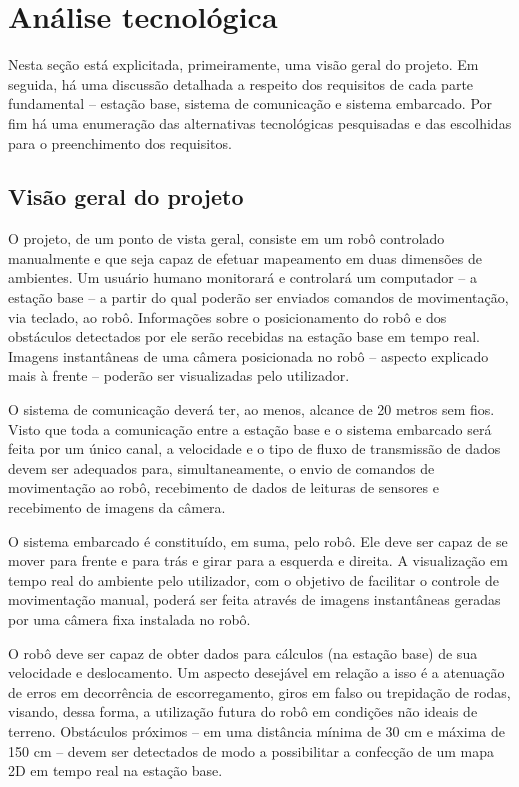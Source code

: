 \chapter{Análise tecnológica}
Nesta seção está explicitada, primeiramente, uma visão geral do projeto. Em seguida, há uma discussão detalhada a respeito dos requisitos de cada parte fundamental -- estação base, sistema de comunicação e sistema embarcado. Por fim há uma enumeração das alternativas tecnológicas pesquisadas e das escolhidas para o preenchimento dos requisitos.

\section{Visão geral do projeto}

O projeto, de um ponto de vista geral, consiste em um robô controlado manualmente e que seja capaz de efetuar mapeamento em duas dimensões de ambientes. Um usuário humano monitorará e controlará um computador -- a estação base -- a partir do qual poderão ser enviados comandos de movimentação, via teclado, ao robô. Informações sobre o posicionamento do robô e dos obstáculos detectados por ele serão recebidas na estação base em tempo real. Imagens instantâneas de uma câmera posicionada no robô -- aspecto explicado mais à frente -- poderão ser visualizadas pelo utilizador.

O sistema de comunicação deverá ter, ao menos, alcance de 20 metros sem fios. Visto que toda a comunicação entre a estação base e o sistema embarcado será feita por um único canal, a velocidade e o tipo de fluxo de transmissão de dados devem ser adequados para, simultaneamente, o envio de comandos de movimentação ao robô, recebimento de dados de leituras de sensores e recebimento de imagens da câmera.

O sistema embarcado é constituído, em suma, pelo robô. Ele deve ser capaz de se mover para frente e para trás e girar para a esquerda e direita. A visualização em tempo real do ambiente pelo utilizador, com o objetivo de facilitar o controle de movimentação manual, poderá ser feita através de imagens instantâneas geradas por uma câmera fixa instalada no robô. 

O robô deve ser capaz de obter dados para cálculos (na estação base) de sua velocidade e deslocamento. Um aspecto desejável em relação a isso é a atenuação de erros em decorrência de escorregamento, giros em falso ou trepidação de rodas, visando, dessa forma, a utilização futura do robô em condições não ideais de terreno. Obstáculos próximos -- em uma distância mínima de 30 cm e máxima de 150 cm -- devem ser detectados de modo a possibilitar a confecção de um mapa 2D em tempo real na estação base.



